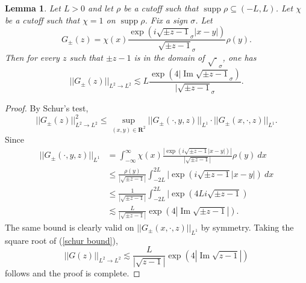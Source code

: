 \documentclass[reqno,12pt,letterpaper]{amsart}
\newcommand{\RR}{\mathbf{R}}
\DeclareMathOperator{\supp}{supp}
\renewcommand{\Im}{\operatorname{Im}}
\newtheorem{lemma}[theorem]{Lemma}
\theoremstyle{definition}
\begin{document}
\begin{lemma}
\label{bounds on partial resolvent}
Let $L > 0$ and let $\rho$ be a cutoff such that $\supp \rho \subseteq (-L, L)$.
Let $\chi$ be a cutoff such that $\chi = 1$ on $\supp \rho$.
Fix a sign $\sigma$.
Let
$$G_\pm(z) = \chi(x) \frac{\exp(i\sqrt{\pm z - 1}_\sigma|x-y|)}{\sqrt{\pm z - 1}_\sigma} \rho(y).$$
Then for every $z$ such that $\pm z - 1$ is in the domain of $\sqrt\cdot_\sigma$, one has
$$||G_\pm(z)||_{L^2 \to L^2} \lesssim L\frac{\exp(4|\Im \sqrt{\pm z - 1}_\sigma)}{|\sqrt{\pm z - 1}_\sigma}.$$
\end{lemma}
\begin{proof}
By Schur's test,
\begin{equation}
\label{schur bound}
||G_\pm(z)||_{L^2 \to L^2}^2 \leq \sup_{(x, y) \in \RR^2} ||G_\pm (\cdot, y, z)||_{L^1}\cdot||G_\pm (x, \cdot, z)||_{L^1}.
\end{equation}
Since
\begin{align*}
||G_\pm (\cdot, y, z)||_{L^1} &= \int_{-\infty}^\infty \chi(x) \frac{|\exp(i\sqrt{\pm z-1}|x-y|)|}{|\sqrt{\pm z-1}|}\rho(y)~dx\\
&\leq \frac{\rho(y)}{|\sqrt{\pm z-1}|} \int_{-2L}^{2L} |\exp(i\sqrt{\pm z-1}|x-y|)~dx\\
&\leq \frac{1}{|\sqrt{\pm z-1}|} \int_{-2L}^{2L} |\exp(4Li\sqrt{\pm z-1})\\
&\lesssim \frac{L}{|\sqrt{\pm z-1}|} \exp(4 |\Im\sqrt{\pm z-1}|).
\end{align*}
The same bound is clearly valid on $||G_\pm(x, \cdot, z)||_{L^1}$ by symmetry. Taking the square root of (\ref{schur bound}),
$$||G(z)||_{L^2 \to L^2} \lesssim \frac{L}{|\sqrt{z-1}|} \exp(4 |\Im\sqrt{z-1}|)$$
follows and the proof is complete.
\end{proof}
\end{document}
